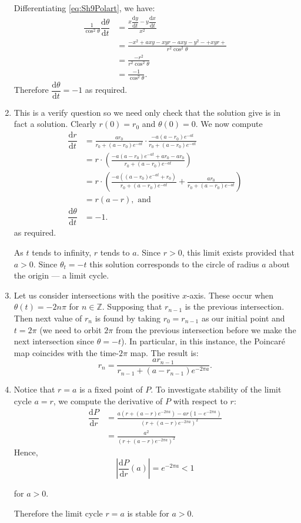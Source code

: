 \documentclass[
  a4paper,
  oneside,
  final]{krantz}
\newcommand{\Z}{\mathbb{Z}}
\renewcommand{\d}{\mathrm{d}}
\newcommand{\der}[2]{\dfrac{\d #1}{\d #2}}
\theoremstyle{definition}
\theoremstyle{definition}
\theoremstyle{definition}
\theoremstyle{definition}
\theoremstyle{remark}
\begin{document}
\begin{enumerate}
  Differentiating \eqref{eq:Sh9Polart}, we have:
  \begin{align}
    \frac{1}{\cos^2 \theta} \der{\theta}{t} &= \frac{x \der{y}{t} - y \der{x}{t}}{x^2} \\
                  &= \frac{-x^2 +axy - xyr - axy - y^2 -+xy r + }{r^2 \cos^2 \theta}\\
                  &= \frac{-r^2}{r^2 \cos^2 \theta} \\
                  &= \frac{-1}{\cos^2 \theta}.
   \end{align}
  Therefore \(\der{\theta}{t} = -1\) as required.
\item
  This is a verify question so we need only check that the solution give is in fact a solution. Clearly \(r(0) = r_0\) and \(\theta(0) = 0\). We now compute
  \begin{align*}
       \der{r}{t} &= \frac{ar_0}{ r_0 + (a-r_0)e^{-at}} \cdot \frac{-a(a-r_0)e^{-at}}{r_0 + (a-r_0)e^{-at}} \\
                  &= r \cdot \left(\frac{-a(a-r_0)e^{-at} + ar_0 - ar_0}{r_0 + (a-r_0)e^{-at}}\right) \\
                  &= r \cdot \left(\frac{-a\left(( a-r_0)e^{-at} + r_0\right)}{r_0 + (a-r_0)e^{-at}} + \frac{ar_0}{r_0 + (a-r_0)e^{-at}} \right) \\
                  &= r (a-r), \text{ and } \\
       \der{\theta}{t} &= -1.
   \end{align*}
  as required.

  As \(t\) tends to infinity, \(r\) tends to \(a\). Since \(r>0\), this limit exists provided that \(a>0\). Since \(\theta_{t} = -t\) this solution corresponds to the circle of radius \(a\) about the origin --- a limit cycle.
\item
  Let us consider intersections with the positive \(x\)-axis. These occur when \(\theta(t) = -2n\pi\) for \(n \in \Z\). Supposing that \(r_{n-1}\) is the previous intersection. Then next value of \(r_n\) is found by taking \(r_0 = r_{n-1}\) as our initial point and \(t = 2 \pi\) (we need to orbit \(2\pi\) from the previous intersection before we make the next intersection since \(\theta = - t\)). In particular, in this instance, the Poincaré map coincides with the time-\(2\pi\) map. The result is:
  \[
       r_{n} = \frac{ar_{n-1}}{ r_{n-1} + (a-r_{n-1})e^{-2\pi a}}.
   \]
\item
  Notice that \(r=a\) is a fixed point of \(P\). To investigate stability of the limit cycle \(a = r\), we compute the derivative of \(P\) with respect to \(r\):
  \begin{align*}
       \der{P}{r} &=\frac{a(r+ (a-r)e^{-2\pi a}) - ar(1 - e^{-2\pi a})}{(r + (a-r)e^{-2\pi a})^2} \\
             &= \frac{a^2}{{(r + (a-r)e^{-2\pi a})^2}}
   \end{align*}
  Hence,
  \[
       \left|\der{P}{r}(a)\right|  = e^{-2\pi a} < 1 
   \]

  for \(a>0\).

  Therefore the limit cycle \(r=a\) is stable for \(a>0\).
\end{enumerate}
\end{document}
